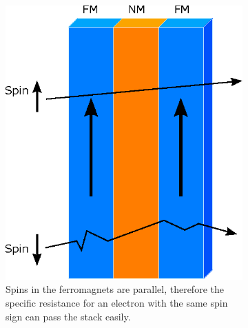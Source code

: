 	\begin{figure}[t]
	\begin{subfigure}[l]{0.49\linewidth} 
		\centering
		\includegraphics[clip,trim={0mm 0mm 0mm 0mm}, scale=.6]{Ressourcen/IMG/Spin-valve-GMRparallel.eps}
		\caption{Spins in the ferromagnets are parallel, therefore the specific resistance for an electron with the same spin sign can pass the stack easily.}
		\label{fig:nano:GMR:parallel}
	\end{subfigure}
	\hfil
	\begin{subfigure}[r]{0.49\linewidth} 
		\centering

\end{subfigure}
\end{figure}
